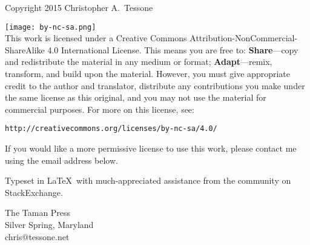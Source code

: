 \begingroup 
\footnotesize 
\parindent 0pt 
\parskip \baselineskip 
Copyright \textcopyright{} 2015 Christopher A.~Tessone

\texttt{[image: by-nc-sa.png]}\\
This work is licensed under a Creative Commons
Attribution-NonCommercial-ShareAlike 4.0 International License. This
means you are free to: \textbf{Share}---copy and redistribute the
material in any medium or format; \textbf{Adapt}---remix, transform,
and build upon the material. However, you must give appropriate credit
to the author and translator, distribute any contributions you make
under the same license as this original, and you may not use the
material for commercial purposes. For more on this license, see:

\texttt{http://creativecommons.org/licenses/by-nc-sa/4.0/}

If you would like a more permissive license to use this work, please
contact me using the email address below.

Typeset in \LaTeX\ with much-appreciated assistance from the
community on StackExchange. %


\vfill 

The Taman Press\\
Silver Spring, Maryland\\
chris@tessone.net

\endgroup 
\pagestyle{empty}
\clearpage 
